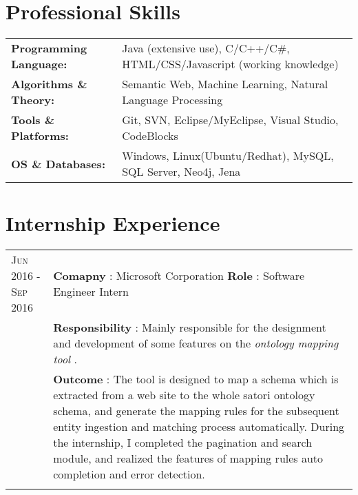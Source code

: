 \documentclass[a4paper,10pt]{article}
\begin{document}
\section{Professional Skills}
\begin{tabular}{R{3.9cm}l}
%
\textbf{Programming Language:}		& Java (extensive use), C/C++/C\#, HTML/CSS/Javascript (working knowledge) \\
\textbf{Algorithms \& Theory:}	    & Semantic Web, Machine Learning, Natural Language Processing\\
\textbf{Tools \& Platforms:}	    & Git, SVN, Eclipse/MyEclipse, Visual Studio, CodeBlocks \\
\textbf{OS \& Databases:}			& Windows, Linux(Ubuntu/Redhat), MySQL, SQL Server, Neo4j, Jena \\
%
\end{tabular}

\section{Internship Experience}

\begin{tabular}{R{3.2cm}p{13cm}}
%
 \textsc{Jun 2016 - Sep 2016} 		& \textbf{Comapny} : Microsoft Corporation  \hspace{15 mm} \textbf{Role} : Software Engineer Intern \\
 							& \textbf{Responsibility}  : \normalsize{Mainly responsible for the designment and development of some features on the \emph{ontology mapping tool} .  }\\
 							& \textbf{Outcome}  : \normalsize{The tool is designed to map a schema which is extracted from a web site to the whole satori ontology schema, and generate the mapping rules for the subsequent entity ingestion and matching process automatically. During the internship, I completed the pagination and search module, and realized the features of mapping rules auto completion and error detection. } \\
%
  \\
%
\end{tabular}

\end{document}
